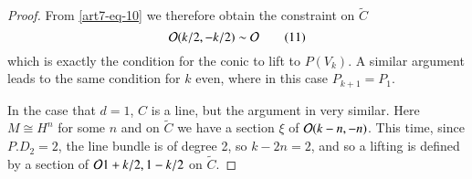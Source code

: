\begin{proof}
From \eqref{art7-eq-10} we therefore obtain the constraint on $\tilde{C}$
\begin{equation*}\label{art7-eq-11}
\mathcal{O}(k/2, -k/2)\sim \mathcal{O}\tag{11}
\end{equation*}
which is exactly the condition for the conic to lift to $P(V_{k})$. A similar argument leads to the same condition for $k$ even, where in this case $P_{k+1} = P_{1}$.

In the case that $d =1$, $C$ is a line, but the argument in  very similar. Here $M\cong H^{n}$ for some $n$ and on $\tilde{C}$ we have a section $\xi$ of $\mathcal{O}(k-n, -n)$. This time, since $P.D_{2} = 2$, the line bundle is of degree 2, so $k-2n =2$, and so a lifting is defined by a section of $\mathcal{O}{1+k/2, 1-k/2}$ on $\tilde{C}$.
\end{proof}

